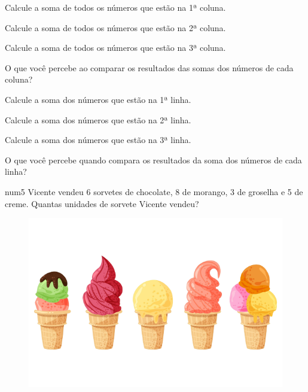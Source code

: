 \begin{escolha}
\item Calcule a soma de todos os números que estão na 1ª coluna.

\pagebreak
\item Calcule a soma de todos os números que estão na 2ª coluna.

\item Calcule a soma de todos os números que estão na 3ª coluna.

\item O que você percebe ao comparar os resultados das somas dos números de cada coluna?

\item Calcule a soma dos números que estão na 1ª linha.

\item Calcule a soma dos números que estão na 2ª linha.

\item Calcule a soma dos números que estão na 3ª linha.

\item O que você percebe quando compara os resultados da soma dos números de cada linha?
\end{escolha}

num{5} Vicente vendeu 6 sorvetes de chocolate, 8 de morango, 3
de groselha e 5 de creme. Quantas unidades de sorvete Vicente vendeu?
\begin{figure}[htpb!]
\centering
\includegraphics[width=.5\textwidth]{./media/image14a.png}
\end{figure}


